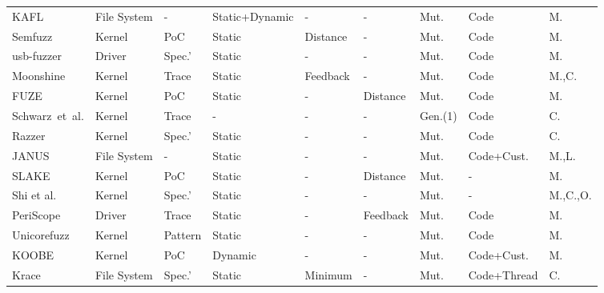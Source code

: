 \begin{footnotesize}
\begin{longtable}{m{1.8cm}m{1.3cm}m{0.6cm}m{1.6cm}m{1.0cm}m{0.8cm}m{0.9cm}m{1.3cm}m{0.5cm}}
        KAFL\cite{schumilo2017kafl} & File System & - & Static+Dynamic & - & - & Mut. & Code & M. \\
        
        Semfuzz\cite{you2017semfuzz} & Kernel & PoC & Static & Distance & - & Mut. & Code & M. \\
        
        usb-fuzzer\cite{Syzkaller} & Driver & Spec.' & Static & - & - & Mut. & Code & M. \\
        
        Moonshine\cite{pailoor2018moonshine} & Kernel & Trace & Static & Feedback & - & Mut. & Code & M.,C. \\
        
        FUZE\cite{wu2018fuze} & Kernel & PoC & Static & - & Distance & Mut. & Code & M. \\
        
        Schwarz~et~al.\cite{schwarz2018automated} & Kernel & Trace & - & - & - & Gen.(1) & Code & C. \\
        
        Razzer\cite{jeong2019razzer} & Kernel & Spec.' & Static & - & - & Mut. & Code & C. \\
        
        JANUS\cite{JANUS2019fuzzing} & File System & - & Static & - & - & Mut. & Code+Cust. & M.,L. \\
        
        SLAKE\cite{chen2019slake} & Kernel & PoC & Static & - & Distance & Mut. & - & M. \\
        
        Shi et al.\cite{shi2019industry} & Kernel & Spec.' & Static & - & - & Mut. & - & M.,C.,O. \\

        PeriScope\cite{Song2019PeriScopeAE} & Driver & Trace & Static & - & Feedback & Mut. & Code & M. \\
        
        Unicorefuzz\cite{Unicorefuzz2019} & Kernel & Pattern & Static & - & - & Mut. & Code & M. \\
        
        KOOBE\cite{chen2020koobe} & Kernel & PoC & Dynamic & - & - & Mut. & Code+Cust. & M. \\
        
        Krace\cite{xu2020krace} & File System & Spec.' & Static & Minimum & - & Mut. & Code+Thread & C. \\
        

\end{longtable}
\end{footnotesize}
